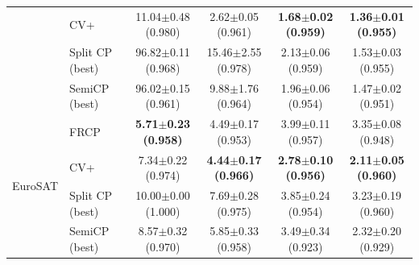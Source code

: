 \begin{table}[t]
\begin{tabular}{llcccc}
 & CV+ & 11.04$\pm$0.48 {\scriptsize(0.980)} & 2.62$\pm$0.05 {\scriptsize(0.961)} & \textbf{1.68$\pm$0.02 {\scriptsize(0.959)}} & \textbf{1.36$\pm$0.01 {\scriptsize(0.955)}}\\
 & Split CP (best) & 96.82$\pm$0.11 {\scriptsize(0.968)} & 15.46$\pm$2.55 {\scriptsize(0.978)} & 2.13$\pm$0.06 {\scriptsize(0.959)} & 1.53$\pm$0.03 {\scriptsize(0.955)}\\
 & SemiCP (best) & 96.02$\pm$0.15 {\scriptsize(0.961)} & 9.88$\pm$1.76 {\scriptsize(0.964)} & 1.96$\pm$0.06 {\scriptsize(0.954)} & 1.47$\pm$0.02 {\scriptsize(0.951)}\\
\midrule
\multirow{4}{*}{EuroSAT} & FRCP & \textbf{5.71$\pm$0.23 {\scriptsize(0.958)}} & 4.49$\pm$0.17 {\scriptsize(0.953)} & 3.99$\pm$0.11 {\scriptsize(0.957)} & 3.35$\pm$0.08 {\scriptsize(0.948)}\\
 & CV+ & 7.34$\pm$0.22 {\scriptsize(0.974)} & \textbf{4.44$\pm$0.17 {\scriptsize(0.966)}} & \textbf{2.78$\pm$0.10 {\scriptsize(0.956)}} & \textbf{2.11$\pm$0.05 {\scriptsize(0.960)}}\\
 & Split CP (best) & 10.00$\pm$0.00 {\scriptsize(1.000)} & 7.69$\pm$0.28 {\scriptsize(0.975)} & 3.85$\pm$0.24 {\scriptsize(0.954)} & 3.23$\pm$0.19 {\scriptsize(0.960)}\\
 & SemiCP (best) & 8.57$\pm$0.32 {\scriptsize(0.970)} & 5.85$\pm$0.33 {\scriptsize(0.958)} & 3.49$\pm$0.34 {\scriptsize(0.923)} & 2.32$\pm$0.20 {\scriptsize(0.929)}\\
\bottomrule
\end{tabular}
\end{table}
